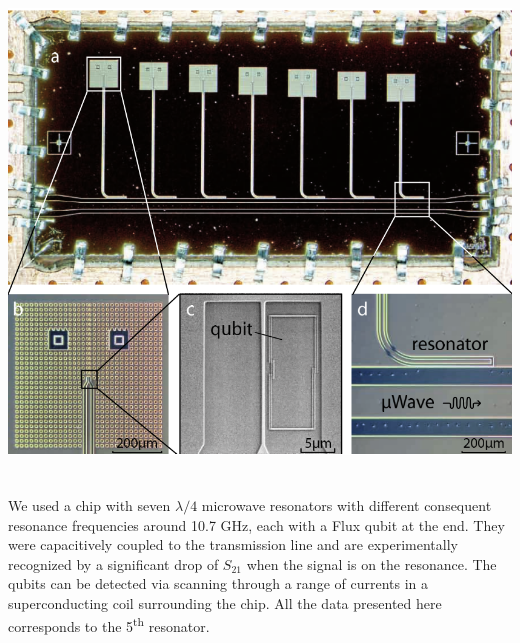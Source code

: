 \documentclass[a0, portrait]{a0poster}
\begin{document}
\begin{multicols}{2}
\begin{tcolorbox}[left=1cm, right=1cm, top=0.5cm, bottom=0.5cm, 
                  title={\Large Sample design}, bottomtitle=.3cm,toptitle=.5cm
                  ]
\begin{minipage}{0.5\textwidth}
\centering
\includegraphics[height=13cm]{Pictures/marcus_chip}
\end{minipage}
\begin{minipage}{0.5\textwidth}
We used a chip with seven $\lambda/4$ microwave resonators with different
consequent resonance frequencies around 10.7 GHz, each with a Flux qubit at the end. They were capacitively coupled to the transmission line and are experimentally recognized by a significant drop of $S_{21}$ when the signal is on the resonance. The qubits can be detected via scanning through a range of currents in a superconducting coil surrounding the chip. All the data presented here corresponds to the 5\textsuperscript{th} resonator. 
\end{minipage}
\end{tcolorbox}


\end{multicols}
\end{document}
